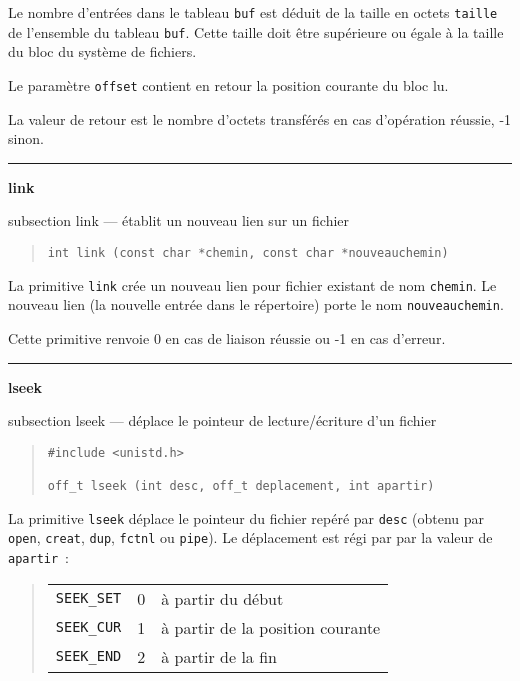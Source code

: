 \documentclass [twoside] {report}
\newcommand {\primitive} [1]
    {
	\phantomsection
	{\large \textbf {#1}}
	\addcontentsline {toc} {subsection} {#1}
    }
\newcommand {\separation}
    {
	\vspace {5mm}
	\nopagebreak
	\hrule
    }
\begin{document}
Le nombre d'entrées dans le tableau \texttt {buf} est déduit de la taille en
octets \texttt {taille} de l'ensemble du tableau \texttt {buf}. Cette taille
doit être supérieure ou égale à la taille du bloc du système de
fichiers.

Le paramètre \texttt {offset} contient en retour la position courante du bloc
lu.

La valeur de retour est le nombre d'octets transférés en cas d'opération
réussie, -1 sinon.


\separation
\primitive {link} --- établit un nouveau lien sur un fichier

\begin {quote}
\begin {verbatim}
int link (const char *chemin, const char *nouveauchemin)
\end{verbatim}
\end {quote}

La primitive \texttt {link} crée un nouveau lien pour
fichier existant de nom \texttt {chemin}. Le nouveau lien
(la nouvelle entrée dans le répertoire) porte
le nom \texttt {nouveauchemin}.

Cette primitive renvoie 0 en cas de liaison
réussie ou -1 en cas d'erreur.




\separation
\primitive {lseek} --- déplace le pointeur de lecture/écriture d'un fichier
    \label {lseek}

\begin {quote}
\begin {verbatim}
#include <unistd.h>

off_t lseek (int desc, off_t deplacement, int apartir)
\end{verbatim}
\end {quote}

La primitive \texttt {lseek} déplace le pointeur du
fichier repéré par \texttt {desc} (obtenu par
\texttt {open}, \texttt {creat}, \texttt {dup}, \texttt {fctnl} ou \texttt {pipe}).
Le déplacement est régi par par la valeur de
\texttt {apartir}~:

\begin {quote}
    \begin {tabular} {|lll|} \hline
	\texttt {SEEK\_SET} & 0 & à partir du début \\
	\texttt {SEEK\_CUR} & 1 & à partir de la position courante \\
	\texttt {SEEK\_END} & 2 & à partir de la fin \\ \hline
    \end {tabular}
\end {quote}
\end{document}
